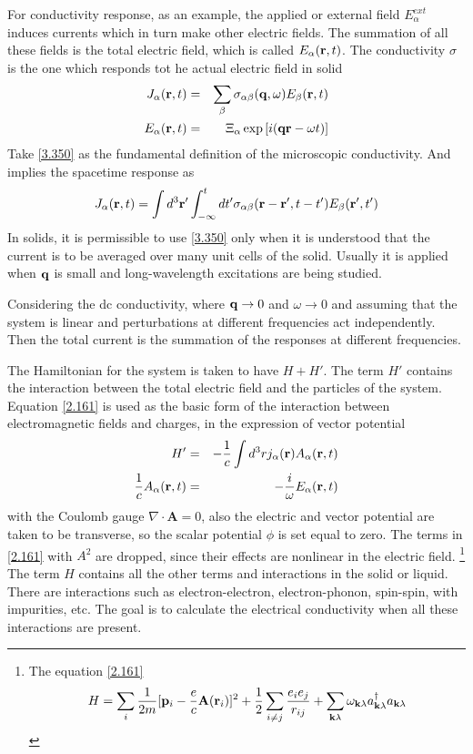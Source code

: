 For conductivity response, as an example, the applied or external field $E_\alpha^{ext}$ induces currents which in turn make other electric fields.
The summation of all these fields is the total electric field, which is called $E_\alpha(\mathbf{r},t)$.
The conductivity $\sigma$ is the one which responds tot he actual electric field in solid
\begin{eqnarray}
    J_\alpha (\mathbf{r},t) &=& \sum_\beta \sigma_{\alpha\beta} (\mathbf{q},\omega) E_\beta(\mathbf{r},t)    \label{3.350} \\
    E_\alpha (\mathbf{r},t) &=& \Xi_\alpha \exp \left[ i(\mathbf{q} \mathbf{r} - \omega t)  \right]   \label{3.351}
\end{eqnarray}
Take \eqref{3.350} as the fundamental definition of the microscopic conductivity.
And implies the spacetime response as
\begin{equation}
    J_\alpha (\mathbf{r},t) = \int d^3 \mathbf{r}' \int_{-\infty}^t dt' \sigma_{\alpha\beta}(\mathbf{r}-\mathbf{r}',t-t') E_\beta (\mathbf{r}',t')     \label{3.352}
\end{equation}
In solids, it is permissible to use \eqref{3.350} only when it is understood that the current is to be averaged over many unit cells of the solid.
Usually it is applied when $\mathbf{q}$ is small and long-wavelength excitations are being studied.

Considering the dc conductivity, where $\mathbf{q}\to 0$ and $\omega \to 0$ and assuming that the system is linear and perturbations at different frequencies act independently.
Then the total current is the summation of the responses at different frequencies.

The Hamiltonian for the system is taken to have $H+H'$.
The term $H'$ contains the interaction between the total electric field and the particles of the system.
Equation \eqref{2.161} is used as the basic form of the interaction between electromagnetic fields and charges, in the expression of vector potential
\begin{eqnarray}
    H' &=& - \frac{1}{c} \int d^3 r j_\alpha(\mathbf{r}) A_\alpha (\mathbf{r},t)    \label{3.354} \\
    \frac{1}{c} A_\alpha (\mathbf{r},t) &=& - \frac{i}{\omega} E_\alpha (\mathbf{r},t)    \label{3.355}
\end{eqnarray}
with the Coulomb gauge $\nabla \cdot \mathbf{A} = 0$, also the electric and vector potential are taken to be transverse, so the scalar potential $\phi$ is set equal to zero.
The terms in \eqref{2.161} with $A^2$ are dropped, since their effects are nonlinear in the electric field.
\footnote{ The equation \eqref{2.161}
\begin{equation}
      H=\sum_i \frac{1}{2m}[\mathbf{p}_i - \frac{e}{c} \mathbf{A}(\mathbf{r}_i)]^2 + \frac{1}{2} \sum_{i\neq j}\frac{e_i e_j}{r_{ij}} + \sum_{\mathbf{k} \lambda} \omega_{\mathbf{k} \lambda} a^\dagger_{\mathbf{k} \lambda} a_{\mathbf{k} \lambda} \nonumber
\end{equation}
}
The term $H$ contains all the other terms and interactions in the solid or liquid.
There are interactions such as electron-electron, electron-phonon, spin-spin, with impurities, etc.
The goal is to calculate the electrical conductivity when all these interactions are present.

